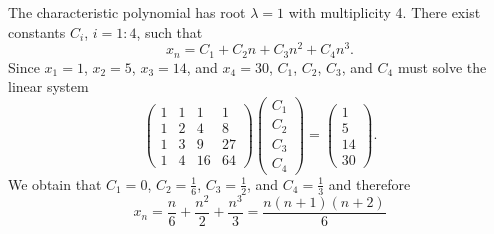 The characteristic polynomial has root $ \lambda = 1 $ with multiplicity 4.
There exist constants $ C_i $, $ i = 1 : 4 $, such that
\begin{equation*}
    x_n = C_1 + C_2 n + C_3 n^2 + C_4 n^3.
\end{equation*}
Since $ x_1 = 1 $, $ x_2 = 5 $, $ x_3 = 14 $, and $ x_4 = 30 $, $ C_1 $, $ C_2 $, $ C_3 $, and $ C_4 $ must solve the linear system
\begin{equation*}
    \begin{pmatrix}
        1 & 1 & 1 & 1 \\
        1 & 2 & 4 & 8 \\
        1 & 3 & 9 & 27 \\
        1 & 4 & 16 & 64
    \end{pmatrix}
    \begin{pmatrix}
        C_1 \\
        C_2 \\
        C_3 \\
        C_4
    \end{pmatrix}
    =
    \begin{pmatrix}
        1 \\
        5 \\
        14 \\
        30
    \end{pmatrix}.
\end{equation*}
We obtain that $ C_1 = 0 $, $ C_2 = \frac{1}{6} $, $ C_3 = \frac{1}{2} $, and $ C_4 = \frac{1}{3} $ and therefore
\begin{equation*}
    x_n = \frac{n}{6} + \frac{n^2}{2} + \frac{n^3}{3} = \frac{n (n + 1) (n + 2)}{6}
\end{equation*}
